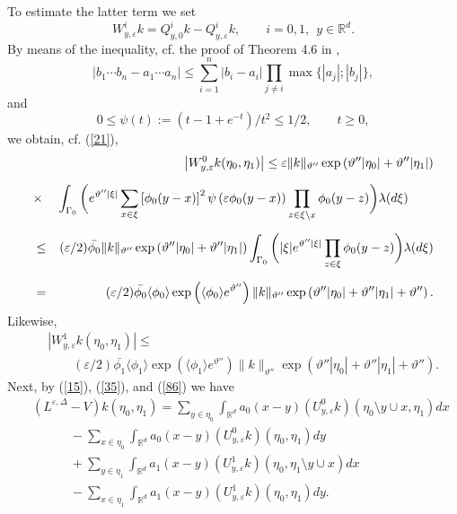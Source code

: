 \documentclass[reqno,11pt]{amsart}
\theoremstyle{definition}
\theoremstyle{remark}
\numberwithin{equation}{section}
\begin{document}
To estimate the latter term we set
\begin{equation}
  \label{86}
W^i_{y,\varepsilon}k = Q^i_{y,0}k - Q^i_{y,\varepsilon}k, \qquad
i=0,1, \ \ y\in \mathds{R}^d.
\end{equation}
By means of the inequality, cf. the proof of Theorem 4.6 in
\cite{BKKK},
\[
\left\vert b_1 \cdots b_n - a_1 \cdots a_n \right\vert \leq
\sum_{i=1}^n |b_i - a_i| \prod_{j\neq i} \max\{|a_j|; |b_j|\},
\]
and
\begin{equation*}
  
0\leq \psi(t) := (t -1 +e^{-t})/t^2 \leq 1/2, \qquad t\geq 0,
\end{equation*}
 we obtain, cf. (\ref{21}),
\begin{eqnarray}
  \label{88}
& & \left\vert W^0_{y,\varepsilon}k (\eta_0, \eta_1)\right\vert \leq
\varepsilon \|k\|_{\vartheta''} \exp\left( \vartheta'' |\eta_0| +
\vartheta''
|\eta_1| \right) \\[.2cm]
&  \times &  \int_{\Gamma_0}\bigg{(} e^{\vartheta'' |\xi|}
\sum_{x\in \xi} \left[ \phi_0(y-x) \right]^2 \psi \left( \varepsilon
\phi_0(y-x)\right) \prod_{z\in \xi\setminus x} \phi_0(y-z)
\bigg{)}\lambda(d \xi)
 \nonumber  \qquad
 \\[.2cm]
&  \leq &( \varepsilon /2)\bar{\phi_0} \|k\|_{\vartheta''}
\exp\left(\vartheta'' |\eta_0| + \vartheta'' |\eta_1| \right)
\int_{\Gamma_0}\bigg{(} |\xi| e^{\vartheta'' |\xi|} \prod_{z\in \xi}
\phi_0(y-z) \bigg{)}\lambda(d \xi) \nonumber \\[.2cm]
& = & (\varepsilon/2) \bar{\phi_0}  \langle \phi_0 \rangle
\exp\left( \langle \phi_0 \rangle e^{\vartheta''} \right)
\|k\|_{\vartheta''} \exp\left( \vartheta'' |\eta_0| + \vartheta''
|\eta_1| +\vartheta'' \right). \nonumber
\end{eqnarray}
Likewise,
\begin{eqnarray}
  \label{88a}
& & \left\vert W^1_{y,\varepsilon}k (\eta_0, \eta_1)\right\vert \leq
\\[.2cm]& & \qquad (\varepsilon/2) \bar{\phi_1}  \langle \phi_1 \rangle \exp\left(
\langle \phi_1 \rangle e^{\vartheta''} \right) \|k\|_{\vartheta''}
\exp\left( \vartheta'' |\eta_0| + \vartheta'' |\eta_1| +\vartheta''
\right). \nonumber
\end{eqnarray}
Next, by (\ref{15}), (\ref{35}), and (\ref{86}) we have
\begin{eqnarray}
  \label{350}
 & & (L^{\varepsilon,\Delta} - V)k(\eta_0 , \eta_1)   =  \sum_{y\in \eta_0}
\int_{\mathds{R}^d} a_0 (x-y) (U^0_{y,\varepsilon} k)
(\eta_0\setminus y \cup x,
\eta_1) d x \qquad \qquad  \nonumber \\[.2cm]
& & \qquad \quad -  \sum_{x\in \eta_0} \int_{\mathds{R}^d} a_0 (x-y)
(U^0_{y,\varepsilon} k) (\eta_0,
\eta_1) d y  \\[.2cm]
& & \qquad \quad  +  \sum_{y\in \eta_1} \int_{\mathds{R}^d} a_1
(x-y) (U^1_{y,\varepsilon} k) (\eta_0,
\eta_1\setminus y \cup x) d x \nonumber \\[.2cm]& & \qquad \quad  -  \sum_{x\in \eta_1} \int_{\mathds{R}^d} a_1 (x-y)
(U^1_{y,\varepsilon} k) (\eta_0, \eta_1) d y. \nonumber
\end{eqnarray}
\end{document}
